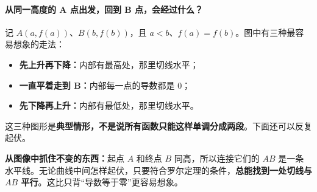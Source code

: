 \clearpage
\begin{explanationbox}
\par\medskip
\noindent\begin{minipage}{\linewidth}
\paragraph{从同一高度的 A 点出发，回到 B 点，会经过什么？}
\begin{center}\end{center}
\end{minipage}\par\medskip

记 $A(a,f(a))$、$B(b,f(b))$，且 $a<b$、$f(a)=f(b)$。图中有三种最容易想象的走法：
\begin{itemize}
\item \textbf{先上升再下降：}内部有最高处，那里切线水平；
\item \textbf{一直平着走到 B：}内部每一点的导数都是 $0$；
\item \textbf{先下降再上升：}内部有最低处，那里切线水平。
\end{itemize}
这三种图形是\textbf{典型情形，不是说所有函数只能这样单调分成两段}。下面还可以反复起伏。

\textbf{从图像中抓住不变的东西：}起点 $A$ 和终点 $B$ 同高，所以连接它们的 $AB$ 是一条水平线。无论曲线中间怎样起伏，只要符合罗尔定理的条件，\textbf{总能找到一处切线与 $AB$ 平行}。这比只背“导数等于零”更容易想象。

\end{explanationbox}
\clearpage
